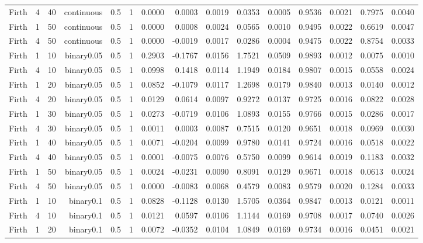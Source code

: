 \begin{longtable}{rrrrrrrrrrrrrrr}
  Firth & 4 & 40 & continuous & 0.5 & 1 & 0.0000 & 0.0003 & 0.0019 & 0.0353 & 0.0005 & 0.9536 & 0.0021 & 0.7975 & 0.0040 \\ 
  Firth & 1 & 50 & continuous & 0.5 & 1 & 0.0000 & 0.0008 & 0.0024 & 0.0565 & 0.0010 & 0.9495 & 0.0022 & 0.6619 & 0.0047 \\ 
  Firth & 4 & 50 & continuous & 0.5 & 1 & 0.0000 & -0.0019 & 0.0017 & 0.0286 & 0.0004 & 0.9475 & 0.0022 & 0.8754 & 0.0033 \\ 
  Firth & 1 & 10 & binary0.05 & 0.5 & 1 & 0.2903 & -0.1767 & 0.0156 & 1.7521 & 0.0509 & 0.9893 & 0.0012 & 0.0075 & 0.0010 \\ 
  Firth & 4 & 10 & binary0.05 & 0.5 & 1 & 0.0998 & 0.1418 & 0.0114 & 1.1949 & 0.0184 & 0.9807 & 0.0015 & 0.0558 & 0.0024 \\ 
  Firth & 1 & 20 & binary0.05 & 0.5 & 1 & 0.0852 & -0.1079 & 0.0117 & 1.2698 & 0.0179 & 0.9840 & 0.0013 & 0.0140 & 0.0012 \\ 
  Firth & 4 & 20 & binary0.05 & 0.5 & 1 & 0.0129 & 0.0614 & 0.0097 & 0.9272 & 0.0137 & 0.9725 & 0.0016 & 0.0822 & 0.0028 \\ 
  Firth & 1 & 30 & binary0.05 & 0.5 & 1 & 0.0273 & -0.0719 & 0.0106 & 1.0893 & 0.0155 & 0.9766 & 0.0015 & 0.0286 & 0.0017 \\ 
  Firth & 4 & 30 & binary0.05 & 0.5 & 1 & 0.0011 & 0.0003 & 0.0087 & 0.7515 & 0.0120 & 0.9651 & 0.0018 & 0.0969 & 0.0030 \\ 
  Firth & 1 & 40 & binary0.05 & 0.5 & 1 & 0.0071 & -0.0204 & 0.0099 & 0.9780 & 0.0141 & 0.9724 & 0.0016 & 0.0518 & 0.0022 \\ 
  Firth & 4 & 40 & binary0.05 & 0.5 & 1 & 0.0001 & -0.0075 & 0.0076 & 0.5750 & 0.0099 & 0.9614 & 0.0019 & 0.1183 & 0.0032 \\ 
  Firth & 1 & 50 & binary0.05 & 0.5 & 1 & 0.0024 & -0.0231 & 0.0090 & 0.8091 & 0.0129 & 0.9671 & 0.0018 & 0.0613 & 0.0024 \\ 
  Firth & 4 & 50 & binary0.05 & 0.5 & 1 & 0.0000 & -0.0083 & 0.0068 & 0.4579 & 0.0083 & 0.9579 & 0.0020 & 0.1284 & 0.0033 \\ 
  Firth & 1 & 10 & binary0.1 & 0.5 & 1 & 0.0828 & -0.1128 & 0.0130 & 1.5705 & 0.0364 & 0.9847 & 0.0013 & 0.0121 & 0.0011 \\ 
  Firth & 4 & 10 & binary0.1 & 0.5 & 1 & 0.0121 & 0.0597 & 0.0106 & 1.1144 & 0.0169 & 0.9708 & 0.0017 & 0.0740 & 0.0026 \\ 
  Firth & 1 & 20 & binary0.1 & 0.5 & 1 & 0.0072 & -0.0352 & 0.0104 & 1.0849 & 0.0169 & 0.9734 & 0.0016 & 0.0451 & 0.0021 \\ 

\end{longtable}
